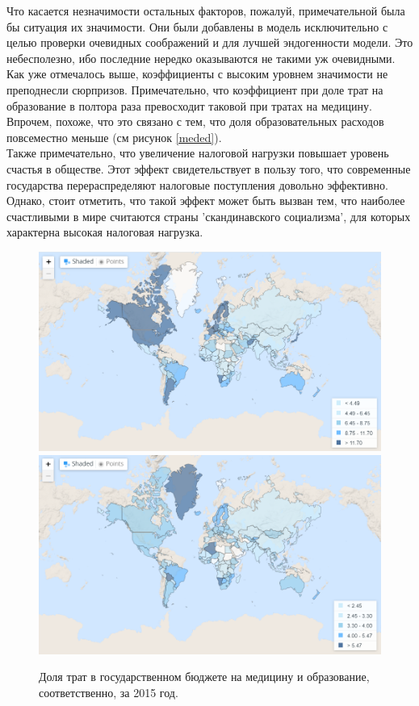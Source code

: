 \documentclass[russian]{vegareport}
\begin{document}
        Что касается незначимости остальных факторов, пожалуй, примечательной была бы ситуация их значимости. Они были добавлены в модель исключительно с целью проверки очевидных соображений и для лучшей эндогенности модели. Это небесполезно, ибо последние нередко оказываются не такими уж очевидными.
        \\
        Как уже отмечалось выше, коэффициенты с высоким уровнем значимости не преподнесли сюрпризов. 
        Примечательно, что коэффициент при доле трат на образование в полтора раза превосходит таковой при тратах на медицину.
         Впрочем, похоже, что это связано с тем, что доля образовательных расходов повсеместно меньше (см рисунок \ref{meded}).
        \\
        Также примечательно, что увеличение налоговой нагрузки повышает уровень счастья в обществе. Этот эффект свидетельствует в пользу того, что современные государства перераспределяют налоговые поступления довольно эффективно. Однако, стоит отметить, что такой эффект может быть вызван тем, что наиболее счастливыми в мире считаются страны 'скандинавского социализма', для которых характерна высокая налоговая нагрузка.

        \begin{figure} \label{meded}
            \centering
            \includegraphics[scale=0.5]{meded1.png}
            \includegraphics[scale=0.5]{meded2.png}
            \caption{Доля трат в государственном бюджете на медицину и образование, соответственно, за 2015 год.}
            \label{lect02:pic1}
        \end{figure}
\end{document}
